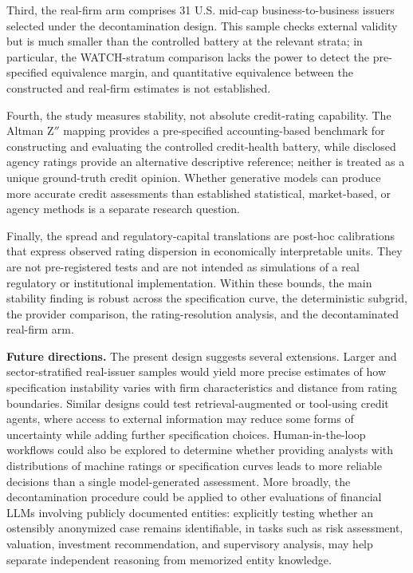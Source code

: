 \documentclass[pdflatex,sn-nature,lineno]{sn-jnl}
\theoremstyle{thmstyleone}
\begin{document}
Third, the real-firm arm comprises 31 U.S. mid-cap business-to-business issuers selected under the
decontamination design. This sample checks external validity but is much smaller than the controlled
battery at the relevant strata; in particular, the WATCH-stratum comparison lacks the power to detect the
pre-specified equivalence margin, and quantitative equivalence between the constructed and real-firm
estimates is not established.

Fourth, the study measures stability, not absolute credit-rating capability. The Altman Z$''$ mapping
provides a pre-specified accounting-based benchmark for constructing and evaluating the controlled
credit-health battery, while disclosed agency ratings provide an alternative descriptive reference;
neither is treated as a unique ground-truth credit opinion. Whether generative models can produce more
accurate credit assessments than established statistical, market-based, or agency methods is a separate
research question.

Finally, the spread and regulatory-capital translations are post-hoc calibrations that express observed
rating dispersion in economically interpretable units. They are not pre-registered tests and are not
intended as simulations of a real regulatory or institutional implementation. Within these bounds, the
main stability finding is robust across the specification curve, the deterministic subgrid, the provider
comparison, the rating-resolution analysis, and the decontaminated real-firm arm.

\noindent\textbf{Future directions.} The present design suggests several extensions. Larger and sector-stratified real-issuer samples would
yield more precise estimates of how specification instability varies with firm characteristics and
distance from rating boundaries. Similar designs could test retrieval-augmented or tool-using credit
agents, where access to external information may reduce some forms of uncertainty while adding further
specification choices. Human-in-the-loop workflows could also be explored to determine whether providing
analysts with distributions of machine ratings or specification curves leads to more reliable decisions
than a single model-generated assessment. More broadly, the decontamination procedure could be applied to
other evaluations of financial LLMs involving publicly documented entities: explicitly testing whether an
ostensibly anonymized case remains identifiable, in tasks such as risk assessment, valuation, investment
recommendation, and supervisory analysis, may help separate independent reasoning from memorized entity
knowledge.
\end{document}
